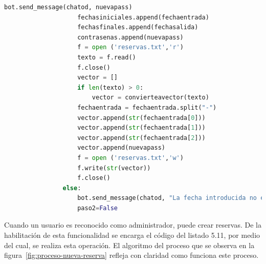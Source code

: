 \begin{lstlisting}[language=Python,
    caption={Crear nueva reserva},
    label=src:crear-nueva-reserva
]
                    bot.send_message(chatod, nuevapass)
                    fechasiniciales.append(fechaentrada)
                    fechasfinales.append(fechasalida)
                    contrasenas.append(nuevapass)
                    f = open ('reservas.txt','r')
                    texto = f.read()
                    f.close()
                    vector = []
                    if len(texto) > 0:
                        vector = convierteavector(texto)
                    fechaentrada = fechaentrada.split("-")
                    vector.append(str(fechaentrada[0]))
                    vector.append(str(fechaentrada[1]))
                    vector.append(str(fechaentrada[2]))
                    vector.append(nuevapass)
                    f = open ('reservas.txt','w')
                    f.write(str(vector))
                    f.close()                    
                else:
                    bot.send_message(chatod, "La fecha introducida no es correcta, por favor, vuelve a empezar")
                    paso2=False
\end{lstlisting}
Cuando un usuario es reconocido como administrador, puede crear reservas. De la habilitación de esta funcionalidad se encarga el código del listado 5.11, por medio del cual, se realiza esta operación. El algoritmo del proceso que se observa en la figura~\ref{fig:proceso-nueva-reserva} refleja con claridad como funciona este proceso.

